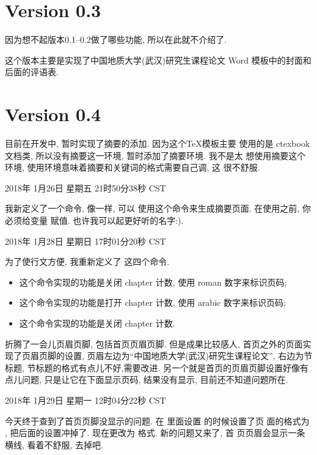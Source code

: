 \documentclass{cugrep}
\begin{document}
\section{Version 0.3}
\label{sec:version_0_3}
因为想不起版本0.1--0.2做了哪些功能, 所以在此就不介绍了.

这个版本主要是实现了中国地质大学(武汉)研究生课程论文 Word 模板中的封面和后面的评语表.
\section{Version 0.4}
\label{sec:version_0_4}

目前在开发中, 暂时实现了摘要的添加. 因为这个\TeX{}模板主要 使用的是
ctexbook 文档类, 所以没有摘要这一环境, 暂时添加了摘要环境. 我不是太
想使用摘要这个环境, 使用环境意味着摘要和关键词的格式需要自己调, 这
很不舒服.

2018年 1月26日 星期五 21时50分38秒 CST

我新定义了一个命令, 像一样, 可以
使用这个命令来生成摘要页面. 在使用之前, 你必须给变量 赋值. 也许我可以起更好听的名字:).

2018年 1月28日 星期日 17时01分20秒 CST

为了使行文方便, 我重新定义了 这四个命令. 

\begin{itemize}
    \item {} 这个命令实现的功能是关闭 chapter 计数, 使用 roman 数字来标识页码;
    \item {} 这个命令实现的功能是打开 chapter 计数, 使用 arabic 数字来标识页码;
    \item {} 这个命令实现的功能是关闭 chapter 计数.
\end{itemize}

折腾了一会儿页眉页脚, 包括首页页眉页脚. 但是成果比较感人, 首页之外的页面实现了页眉页脚的设置,
页眉左边为``中国地质大学(武汉)研究生课程论文'', 右边为节标题, 节标题的格式有点儿不好,需要改进.
另一个就是首页的页眉页脚设置好像有点儿问题, 只是让它在下面显示页码, 结果没有显示, 目前还不知道问题所在. 

2018年 1月29日 星期一 12时04分22秒 CST

今天终于查到了首页页脚没显示的问题. 在  里面设置  的时候设置了页
面的格式为 , 把后面的设置冲掉了. 现在更改为  格式. 新的问题又来了, 首
页页眉会显示一条横线, 看着不舒服, 去掉吧. 
\end{document}

